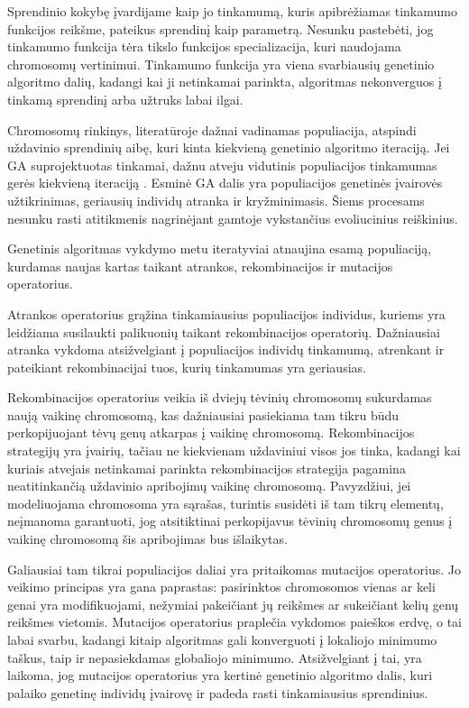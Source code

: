 \documentclass{VUMIFInfKursinis}
\begin{document}
Sprendinio kokybę įvardijame kaip jo tinkamumą, kuris apibrėžiamas tinkamumo funkcijos reikšme, pateikus sprendinį kaip parametrą.
Nesunku pastebėti, jog tinkamumo funkcija tėra tikslo funkcijos specializacija, kuri naudojama chromosomų vertinimui.
Tinkamumo funkcija yra viena svarbiausių genetinio algoritmo dalių,
kadangi kai ji netinkamai parinkta, algoritmas nekonverguos į tinkamą sprendinį arba užtruks labai ilgai.

Chromosomų rinkinys, literatūroje dažnai vadinamas populiacija, atspindi uždavinio sprendinių aibę, kuri kinta kiekvieną genetinio algoritmo iteraciją.
Jei GA suprojektuotas tinkamai, dažnu atveju vidutinis populiacijos tinkamumas gerės kiekvieną iteraciją \cite{simpson1999faster}.
Esminė GA dalis yra populiacijos genetinės įvairovės užtikrinimas, geriausių individų atranka ir kryžminimasis.
Šiems procesams nesunku rasti atitikmenis nagrinėjant gamtoje vykstančius evoliucinius reiškinius.

Genetinis algoritmas vykdymo metu iteratyviai atnaujina esamą populiaciją, kurdamas naujas kartas taikant atrankos, rekombinacijos ir mutacijos operatorius.

Atrankos operatorius grąžina tinkamiausius populiacijos individus, kuriems yra leidžiama susilaukti palikuonių taikant rekombinacijos operatorių.
Dažniausiai atranka vykdoma atsižvelgiant į populiacijos individų tinkamumą, atrenkant ir pateikiant rekombinacijai tuos, kurių tinkamumas yra geriausias.

Rekombinacijos operatorius veikia iš dviejų tėvinių chromosomų sukurdamas naują vaikinę chromosomą, kas dažniausiai pasiekiama
tam tikru būdu perkopijuojant tėvų genų atkarpas į vaikinę chromosomą.
Rekombinacijos strategijų yra įvairių, tačiau ne kiekvienam uždaviniui visos jos tinka, kadangi
kai kuriais atvejais netinkamai parinkta rekombinacijos strategija pagamina neatitinkančią uždavinio apribojimų vaikinę chromosomą.
Pavyzdžiui, jei modeliuojama chromosoma yra sąrašas, turintis susidėti iš tam tikrų elementų, neįmanoma garantuoti, jog atsitiktinai
perkopijavus tėvinių chromosomų genus į vaikinę chromosomą šis apribojimas bus išlaikytas.

Galiausiai tam tikrai populiacijos daliai yra pritaikomas mutacijos operatorius.
Jo veikimo principas yra gana paprastas: pasirinktos chromosomos vienas ar keli genai yra modifikuojami,
nežymiai pakeičiant jų reikšmes ar sukeičiant kelių genų reikšmes vietomis.
Mutacijos operatorius praplečia vykdomos paieškos erdvę, o tai labai svarbu, kadangi kitaip algoritmas gali konverguoti
į lokaliojo minimumo taškus, taip ir nepasiekdamas globaliojo minimumo.
Atsižvelgiant į tai, yra laikoma, jog mutacijos operatorius yra kertinė genetinio algoritmo dalis,
kuri palaiko genetinę individų įvairovę ir padeda rasti tinkamiausius sprendinius.
\end{document}
